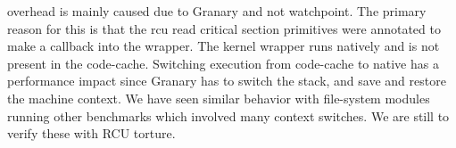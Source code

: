 

overhead is mainly caused due to Granary and not watchpoint. The
primary reason for this is that the rcu read critical section primitives
were annotated to make a callback into the wrapper. The kernel wrapper
runs natively and is not present in the code-cache. Switching execution
from code-cache to native has a performance impact since Granary has
to switch the stack, and save and restore the machine context. We have
seen similar behavior with file-system modules running other benchmarks
which involved many context switches. We are still to verify these
with RCU torture.


